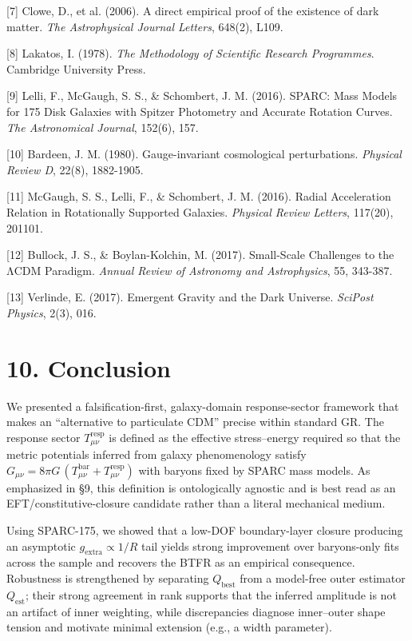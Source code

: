 {[}7{]} Clowe, D., et al. (2006). A direct empirical proof of the existence of dark matter. \emph{The Astrophysical Journal Letters}, 648(2), L109.

{[}8{]} Lakatos, I. (1978). \emph{The Methodology of Scientific Research Programmes}. Cambridge University Press.

{[}9{]} Lelli, F., McGaugh, S. S., \& Schombert, J. M. (2016). SPARC: Mass Models for 175 Disk Galaxies with Spitzer Photometry and Accurate Rotation Curves. \emph{The Astronomical Journal}, 152(6), 157.

{[}10{]} Bardeen, J. M. (1980). Gauge-invariant cosmological perturbations. \emph{Physical Review D}, 22(8), 1882-1905.

{[}11{]} McGaugh, S. S., Lelli, F., \& Schombert, J. M. (2016). Radial Acceleration Relation in Rotationally Supported Galaxies. \emph{Physical Review Letters}, 117(20), 201101.

{[}12{]} Bullock, J. S., \& Boylan-Kolchin, M. (2017). Small-Scale Challenges to the ΛCDM Paradigm. \emph{Annual Review of Astronomy and Astrophysics}, 55, 343-387.

{[}13{]} Verlinde, E. (2017). Emergent Gravity and the Dark Universe. \emph{SciPost Physics}, 2(3), 016.

\section{}\label{section-10}

\section{10. Conclusion}\label{conclusion}

We presented a falsification-first, galaxy-domain response-sector framework that makes an ``alternative to particulate CDM'' precise within standard GR. The response sector \(T_{\mu\nu}^{\text{resp}}\) is defined as the effective stress--energy required so that the metric potentials inferred from galaxy phenomenology satisfy \(G_{\mu\nu} = 8\pi G\,\left( T_{\mu\nu}^{\text{bar}} + T_{\mu\nu}^{\text{resp}} \right)\) with baryons fixed by SPARC mass models. As emphasized in §9, this definition is ontologically agnostic and is best read as an EFT/constitutive-closure candidate rather than a literal mechanical medium.

Using SPARC-175, we showed that a low-DOF boundary-layer closure producing an asymptotic \(g_{\text{extra}} \propto 1\text{/}R\) tail yields strong improvement over baryons-only fits across the sample and recovers the BTFR as an empirical consequence. Robustness is strengthened by separating \(Q_{\text{best}}\) from a model-free outer estimator \(Q_{\text{est}}\); their strong agreement in rank supports that the inferred amplitude is not an artifact of inner weighting, while discrepancies diagnose inner--outer shape tension and motivate minimal extension (e.g., a width parameter).


